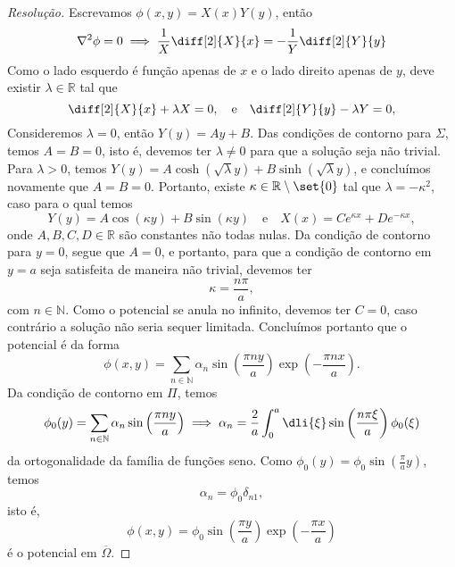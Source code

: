 \begin{proof}[Resolução]
    Escrevamos \(\phi(x, y) = X(x)Y(y)\), então
    \begin{equation*}
        \nabla^2\phi = 0 \implies \frac{1}{X}\diff[2]{X}{x} = -\frac{1}{Y}\diff[2]{Y}{y}
    \end{equation*}
    Como o lado esquerdo é função apenas de \(x\) e o lado direito apenas de \(y\), deve existir  \(\lambda \in \mathbb{R}\) tal que
    \begin{equation*}
        \diff[2]{X}{x} + \lambda X = 0,\quad\text{e}\quad
        \diff[2]{Y}{y} - \lambda Y = 0,
    \end{equation*}
    Consideremos \(\lambda = 0\), então \(Y(y) = Ay + B\). Das condições de contorno para \(\Sigma\), temos \(A = B = 0\), isto é, devemos ter \(\lambda \neq 0\) para que a solução seja não trivial. Para \(\lambda > 0\), temos \(Y(y) = A \cosh(\sqrt{\lambda}y) + B \sinh(\sqrt{\lambda}y)\), e concluímos novamente que \(A = B = 0\). Portanto, existe \(\kappa \in \mathbb{R}\setminus\set{0}\) tal que \(\lambda = -\kappa^2\), caso para o qual temos
    \begin{equation*}
        Y(y) = A \cos(\kappa y) + B \sin(\kappa y)
        \quad\text{e}\quad
        X(x) = C e^{\kappa x} + D e^{-\kappa x},
    \end{equation*}
    onde \(A, B, C, D \in \mathbb{R}\) são constantes não todas nulas. Da condição de contorno para \(y = 0\), segue que \(A = 0\), e portanto, para que a condição de contorno em \(y = a\) seja satisfeita de maneira não trivial, devemos ter
    \begin{equation*}
        \kappa = \frac{n\pi}{a},
    \end{equation*}
    com \(n \in \mathbb{N}\). Como o potencial se anula no infinito, devemos ter \(C = 0\), caso contrário a solução não seria sequer limitada. Concluímos portanto que o potencial é da forma
    \begin{equation*}
        \phi(x,y) = \sum_{n \in \mathbb{N}} \alpha_n \sin\left(\frac{\pi n y}{a}\right) \exp\left(- \frac{\pi n x}{a}\right).
    \end{equation*}
    Da condição de contorno em \(\Pi\), temos
    \begin{equation*}
        \phi_0(y) = \sum_{n\in \mathbb{N}} \alpha_n \sin\left(\frac{\pi n y}{a}\right) \implies \alpha_n = \frac{2}{a}\int_0^a \dli{\xi} \sin\left(\frac{n \pi \xi}{a}\right) \phi_0(\xi)
    \end{equation*}
    da ortogonalidade da família de funções seno. Como \(\phi_0(y) = \phi_0\sin\left(\frac{\pi}{a}y\right)\), temos
    \begin{equation*}
        \alpha_n = \phi_0 \delta_{n1},
    \end{equation*}
    isto é,
    \begin{equation*}
        \phi(x,y) = \phi_0 \sin\left(\frac{\pi y}{a}\right)\exp\left(-\frac{\pi x}{a}\right)
    \end{equation*}
    é o potencial em \(\overline\Omega\).
\end{proof}
